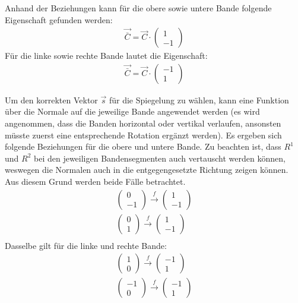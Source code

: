 Anhand der Beziehungen kann für die obere sowie untere Bande folgende Eigenschaft gefunden werden:
\begin{align}
    \vec{\bar{C}} = \vec{C} \cdot \begin{pmatrix}1 \\ -1\end{pmatrix}
\end{align}
Für die linke sowie rechte Bande lautet die Eigenschaft:
\begin{align}
    \vec{\bar{C}} = \vec{C} \cdot \begin{pmatrix}-1 \\ 1\end{pmatrix}
\end{align}

Um den korrekten Vektor $\vec{s}$ für die Spiegelung zu wählen, kann eine Funktion über die Normale auf die jeweilige Bande
angewendet werden (es wird angenommen, dass die Banden horizontal oder vertikal verlaufen, ansonsten müsste zuerst eine
entsprechende Rotation ergänzt werden). Es ergeben sich folgende Beziehungen für die obere und untere Bande. Zu beachten ist, dass $R^1$ und $R^2$ bei den
jeweiligen Bandensegmenten auch vertauscht werden
können, weswegen die Normalen auch in die entgegengesetzte Richtung zeigen können. Aus diesem Grund werden beide Fälle
betrachtet.
\begin{align}
    \begin{pmatrix}0 \\ -1\end{pmatrix} \xrightarrow{f} \begin{pmatrix}1 \\ -1\end{pmatrix}\\
    \begin{pmatrix}0 \\ 1\end{pmatrix} \xrightarrow{f} \begin{pmatrix}1 \\ -1\end{pmatrix}\\
\end{align}
Dasselbe gilt für die linke und rechte Bande:
\begin{align}
    \begin{pmatrix}1 \\ 0\end{pmatrix} \xrightarrow{f} \begin{pmatrix}-1 \\ 1\end{pmatrix}\\
    \begin{pmatrix}-1 \\ 0\end{pmatrix} \xrightarrow{f} \begin{pmatrix}-1 \\ 1\end{pmatrix}\\
\end{align}

